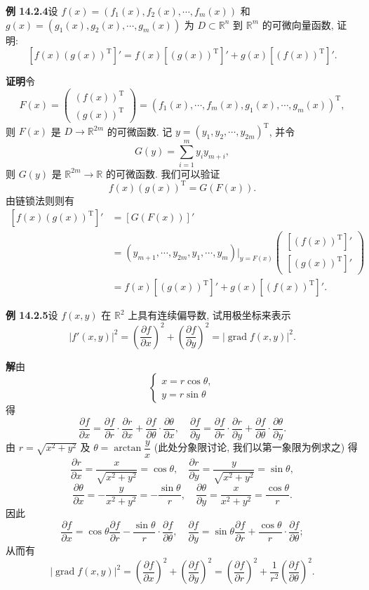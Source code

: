 \documentclass[UTF8,12pt,a4paper,fontset=fandol]{ctexart}
\begin{document}
\noindent\textbf{例 14.2.4}\quad 设 $f(x)=(f_1(x),f_2(x),\cdots,f_m(x))$ 和 $g(x)=(g_1(x),g_2(x),\cdots,g_m(x))$ 为 $D\subset\mathbb R^n$ 到 $\mathbb R^m$ 的可微向量函数, 证明:
\[
  [f(x)(g(x))^\mathrm T]'=f(x)[(g(x))^\mathrm T]'+g(x)[(f(x))^\mathrm T]'.
\]

\noindent\textbf{证明}\quad 令
\[
  F(x)=
  \begin{pmatrix}
    (f(x))^\mathrm T\\
    (g(x))^\mathrm T
  \end{pmatrix}
  =(f_1(x),\cdots,f_m(x),g_1(x),\cdots,g_m(x))^\mathrm T,
\]
则 $F(x)$ 是 $D\to\mathbb R^{2m}$ 的可微函数. 记 $y=(y_1,y_2,\cdots,y_{2m})^\mathrm T$, 并令
\[
  G(y)=\sum_{i=1}^m y_i y_{m+i},
\]
则 $G(y)$ 是 $\mathbb R^{2m}\to\mathbb R$ 的可微函数. 我们可以验证
\[
  f(x)(g(x))^\mathrm T=G(F(x)).
\]
由链锁法则则有
\[
\begin{aligned}
  [f(x)(g(x))^\mathrm T]'
  &=[G(F(x))]'\\
  &=(y_{m+1},\cdots,y_{2m},y_1,\cdots,y_m)\big|_{y=F(x)}
  \begin{pmatrix}
    [(f(x))^\mathrm T]'\\
    [(g(x))^\mathrm T]'
  \end{pmatrix}\\
  &=f(x)[(g(x))^\mathrm T]'+g(x)[(f(x))^\mathrm T]'.
\end{aligned}
\]

\noindent\textbf{例 14.2.5}\quad 设 $f(x,y)$ 在 $\mathbb R^2$ 上具有连续偏导数, 试用极坐标来表示
\[
  |f'(x,y)|^2=
  \left(\frac{\partial f}{\partial x}\right)^2+
  \left(\frac{\partial f}{\partial y}\right)^2
  =|\operatorname{grad}f(x,y)|^2.
\]

\noindent\textbf{解}\quad 由
\[
  \begin{cases}
    x=r\cos\theta,\\
    y=r\sin\theta
  \end{cases}
\]
得
\[
  \frac{\partial f}{\partial x}
  =\frac{\partial f}{\partial r}\cdot\frac{\partial r}{\partial x}
  +\frac{\partial f}{\partial\theta}\cdot\frac{\partial\theta}{\partial x},
  \quad
  \frac{\partial f}{\partial y}
  =\frac{\partial f}{\partial r}\cdot\frac{\partial r}{\partial y}
  +\frac{\partial f}{\partial\theta}\cdot\frac{\partial\theta}{\partial y}.
\]
由 $r=\sqrt{x^2+y^2}$ 及 $\theta=\arctan\dfrac yx$ (此处分象限讨论, 我们以第一象限为例求之) 得
\[
  \frac{\partial r}{\partial x}=\frac{x}{\sqrt{x^2+y^2}}=\cos\theta,\quad
  \frac{\partial r}{\partial y}=\frac{y}{\sqrt{x^2+y^2}}=\sin\theta,
\]
\[
  \frac{\partial\theta}{\partial x}=-\frac{y}{x^2+y^2}=-\frac{\sin\theta}{r},\quad
  \frac{\partial\theta}{\partial y}=\frac{x}{x^2+y^2}=\frac{\cos\theta}{r}.
\]
因此
\[
  \frac{\partial f}{\partial x}
  =\cos\theta\frac{\partial f}{\partial r}
  -\frac{\sin\theta}{r}\cdot\frac{\partial f}{\partial\theta},
  \quad
  \frac{\partial f}{\partial y}
  =\sin\theta\frac{\partial f}{\partial r}
  +\frac{\cos\theta}{r}\cdot\frac{\partial f}{\partial\theta};
\]
从而有
\[
  |\operatorname{grad}f(x,y)|^2
  =
  \left(\frac{\partial f}{\partial x}\right)^2+
  \left(\frac{\partial f}{\partial y}\right)^2
  =
  \left(\frac{\partial f}{\partial r}\right)^2+
  \frac1{r^2}\left(\frac{\partial f}{\partial\theta}\right)^2.
\]
\end{document}
